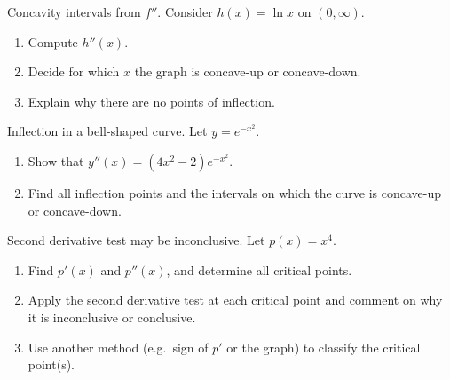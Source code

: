 \documentclass[11pt]{article}
\def\textbf#1{#1}%
\newcounter{question}
\begin{document}
\begin{question}
\textbf{Concavity intervals from $f''$.}
Consider $h(x)=\ln x$ on $(0,\infty)$.
\begin{enumerate}
  \item Compute $h''(x)$.
  \item Decide for which $x$ the graph is concave-up or concave-down.
  \item Explain why there are no points of inflection.
\end{enumerate}
\end{question}

\begin{question}
\textbf{Inflection in a bell-shaped curve.}
Let $y=e^{-x^{2}}$.
\begin{enumerate}
  \item Show that $y''(x)=(4x^{2}-2)e^{-x^{2}}$.
  \item Find all inflection points and the intervals on which the curve is concave-up or concave-down.
\end{enumerate}

\begin{center}
\end{center}
\end{question}

\begin{question}
\textbf{Second derivative test may be inconclusive.}
Let $p(x)=x^{4}$.
\begin{enumerate}
  \item Find $p'(x)$ and $p''(x)$, and determine all critical points.
  \item Apply the second derivative test at each critical point and comment on why it is inconclusive or conclusive.
  \item Use another method (e.g.\ sign of $p'$ or the graph) to classify the critical point(s).
\end{enumerate}
\end{question}
\end{document}
